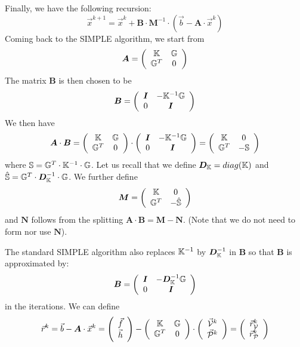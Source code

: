 Finally, we have the following recursion:
\begin{equation}
\boxed{\vec{x}^{k+1} = \vec{x}^k +{\bm B} \cdot {\bm M} ^{-1}\cdot (\vec{b} -{\bm A}\cdot \vec{x}^{k}  ) }
\label{eq:simplerec}
\end{equation}
Coming back to the SIMPLE algorithm, we start from 
\[
{\bm A}=
\left(
\begin{array}{cc}
{\mathbb{K}} & {\mathbb{G}} \\
{\mathbb{G}}^T & 0
\end{array}
\right)
\]
The matrix ${\bm B}$ is then chosen to be 
\[
{\bm B}=
\left(
\begin{array}{cc}
{\bm I} & -{\mathbb{K}}^{-1} {\mathbb{G}} \\
0 & {\bm I}
\end{array}
\right)
\]
We then have 
\[
{\bm A}\cdot  {\bm B} = 
\left(
\begin{array}{cc}
{\mathbb{K}} & {\mathbb{G}} \\
{\mathbb{G}}^T & 0
\end{array}
\right)
\cdot 
\left(
\begin{array}{cc}
{\bm I} & -{\mathbb{K}}^{-1} {\mathbb{G}} \\
0 & {\bm I}
\end{array}
\right)
=
\left(
\begin{array}{cc}
{\mathbb{K}} & 0 \\
{\mathbb{G}}^T & -{\mathbb{S}}
\end{array}
\right)
\]
where ${\mathbb{S}}={\mathbb{G}}^T \cdot {\mathbb{K}}^{-1} \cdot {\mathbb{G}}$.
Let us recall that we define ${\bm D}_{\mathbb{K}} =diag({\mathbb{K}})$ and $\hat{{\mathbb{S}}}={\mathbb{G}}^T \cdot {\bm D}_{\mathbb{K}}^{-1} \cdot {\mathbb{G}}$. 
We further define 
\[
{\bm M}=
\left(
\begin{array}{cc}
{\mathbb{K}} & 0 \\
{\mathbb{G}}^T & -\hat{{\mathbb{S}}}
\end{array}
\right)
\]
and ${\bm N}$ follows from the splitting ${\bm A}\cdot {\bm B}= {\bm M} - {\bm N}$. 
(Note that we do not need to form nor use ${\bm N}$).

The standard SIMPLE algorithm also replaces ${\mathbb{K}}^{-1}$  by  ${\bm D}_{\mathbb{K}}^{-1}$ in ${\bm B}$ so that 
${\bm B}$ is approximated by:
\[
{\bm B}=
\left(
\begin{array}{cc}
{\bm I} & -{\bm D}_{\mathbb{K}}^{-1} {\mathbb{G}} \\
0 & {\bm I}
\end{array}
\right)
\]
in the iterations.
We can define 
\[
\vec{r}^k=
\vec{b}-{\bm A}\cdot \vec{x}^k = 
\left(
\begin{array}{c}
\vec{f} \\ \vec{h}
\end{array}
\right)
-
\left(
\begin{array}{cc}
{\mathbb{K}} & {\mathbb{G}} \\
{\mathbb{G}}^T & 0
\end{array}
\right)
\cdot
\left(
\begin{array}{c}
\vec{\cal V}^k \\ \vec{\cal P}^k
\end{array}
\right)
=
\left(
\begin{array}{c}
\vec{r}_{\cal V}^k \\ \vec{r}_{\cal P}^k
\end{array}
\right)
\]

